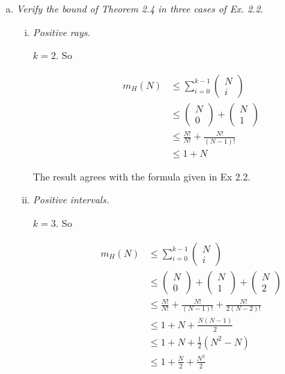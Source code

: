 \documentclass{article}
\begin{document}
\begin{enumerate}[(a)]
  \item \textit{Verify the bound of Theorem 2.4 in three cases of Ex. 2.2.}

    \begin{enumerate}[(i)]

      \item \textit{Positive rays.}

        $k = 2$. So

        \begin{align*}
          m_H(N) &\leq \sum_{i=0}^{k-1} \begin{pmatrix} 
                  N \\ 
                  i 
                  \end{pmatrix} \\
          &\leq \begin{pmatrix} 
                  N \\ 
                  0 
                  \end{pmatrix} +
              \begin{pmatrix} N \\ 1 \end{pmatrix} \\
          &\leq \frac{N!}{N!} + \frac{N!}{(N-1)!} \\
          &\leq 1 + N
        \end{align*}

        The result agrees with the formula given in Ex 2.2.

      \item \textit{Positive intervals.}

        $k = 3$. So 

        \begin{align*}
          m_H(N) &\leq \sum_{i=0}^{k-1} \begin{pmatrix} 
                  N \\ 
                  i 
                  \end{pmatrix} \\
          &\leq \begin{pmatrix} 
                  N \\ 
                  0 
                  \end{pmatrix} +
              \begin{pmatrix} N \\ 1 \end{pmatrix} +
              \begin{pmatrix} N \\ 2 \end{pmatrix} \\
                &\leq \frac{N!}{N!} + \frac{N!}{(N-1)!} + \frac{N!}{2(N-2)!} \\
          &\leq 1 + N + \frac{N(N-1)}{2} \\
          &\leq 1 + N + \frac{1}{2}(N^2 - N) \\
          &\leq 1 + \frac{N}{2} + \frac{N^2}{2}
        \end{align*}


\end{enumerate}
\end{enumerate}
\end{document}
